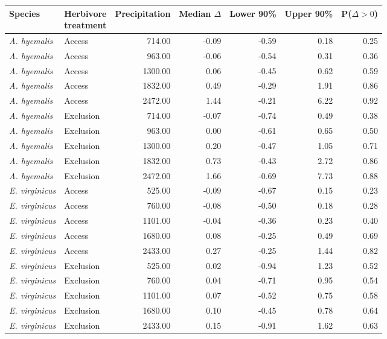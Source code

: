 \begin{tabular}{llrrrrr}
  \hline
Species & \makecell{Herbivore \\ treatment} & Precipitation & Median $\Delta$ & Lower 90\% & Upper 90\% & P($\Delta>0$) \\ 
  \hline
\textit{A. hyemalis} & Access & 714.00 & -0.09 & -0.59 & 0.18 & 0.25 \\ 
  \textit{A. hyemalis} & Access & 963.00 & -0.06 & -0.54 & 0.31 & 0.36 \\ 
  \textit{A. hyemalis} & Access & 1300.00 & 0.06 & -0.45 & 0.62 & 0.59 \\ 
  \textit{A. hyemalis} & Access & 1832.00 & 0.49 & -0.29 & 1.91 & 0.86 \\ 
  \textit{A. hyemalis} & Access & 2472.00 & 1.44 & -0.21 & 6.22 & 0.92 \\ 
  \textit{A. hyemalis} & Exclusion & 714.00 & -0.07 & -0.74 & 0.49 & 0.38 \\ 
  \textit{A. hyemalis} & Exclusion & 963.00 & 0.00 & -0.61 & 0.65 & 0.50 \\ 
  \textit{A. hyemalis} & Exclusion & 1300.00 & 0.20 & -0.47 & 1.05 & 0.71 \\ 
  \textit{A. hyemalis} & Exclusion & 1832.00 & 0.73 & -0.43 & 2.72 & 0.86 \\ 
  \textit{A. hyemalis} & Exclusion & 2472.00 & 1.66 & -0.69 & 7.73 & 0.88 \\ 
  \textit{E. virginicus} & Access & 525.00 & -0.09 & -0.67 & 0.15 & 0.23 \\ 
  \textit{E. virginicus} & Access & 760.00 & -0.08 & -0.50 & 0.18 & 0.28 \\ 
  \textit{E. virginicus} & Access & 1101.00 & -0.04 & -0.36 & 0.23 & 0.40 \\ 
  \textit{E. virginicus} & Access & 1680.00 & 0.08 & -0.25 & 0.49 & 0.69 \\ 
  \textit{E. virginicus} & Access & 2433.00 & 0.27 & -0.25 & 1.44 & 0.82 \\ 
  \textit{E. virginicus} & Exclusion & 525.00 & 0.02 & -0.94 & 1.23 & 0.52 \\ 
  \textit{E. virginicus} & Exclusion & 760.00 & 0.04 & -0.71 & 0.95 & 0.54 \\ 
  \textit{E. virginicus} & Exclusion & 1101.00 & 0.07 & -0.52 & 0.75 & 0.58 \\ 
  \textit{E. virginicus} & Exclusion & 1680.00 & 0.10 & -0.45 & 0.78 & 0.64 \\ 
  \textit{E. virginicus} & Exclusion & 2433.00 & 0.15 & -0.91 & 1.62 & 0.63 \\ 

\end{tabular}
